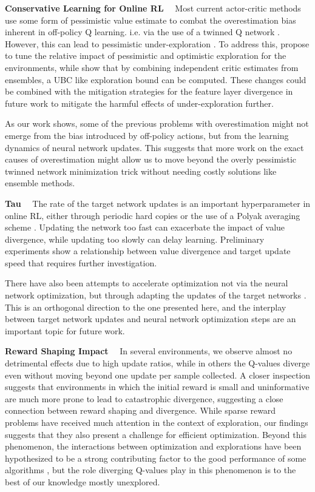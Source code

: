 {\bf Conservative Learning for Online RL}~~ Most current actor-critic methods use some form of pessimistic value estimate to combat the overestimation bias inherent in off-policy Q learning. i.e. via the use of a twinned Q network \parencite{fujimoto2018addressing}.
However, this can lead to pessimistic under-exploration \parencite{lan2020maxmin}.
To address this, \textcite{moskovitz2021tactical} propose to tune the relative impact of pessimistic and optimistic exploration for the environments, while \textcite{lee2021sunrise} show that by combining independent critic estimates from ensembles, a UBC like exploration bound can be computed.
These changes could be combined with the mitigation strategies for the feature layer divergence in future work to mitigate the harmful effects of under-exploration further.

As our work shows, some of the previous problems with overestimation might not emerge from the bias introduced by off-policy actions, but from the learning dynamics of neural network updates.
This suggests that more work on the exact causes of overestimation might allow us to move beyond the overly pessimistic twinned network minimization trick without needing costly solutions like ensemble methods.

{\bf Tau}~~ The rate of the target network updates is an important hyperparameter in online RL, either through periodic hard copies \parencite{mnih2013playing} or the use of a Polyak averaging scheme \parencite{lillicrap2016ddpg}.
Updating the network too fast can exacerbate the impact of value divergence, while updating too slowly can delay learning. Preliminary experiments show a relationship between value divergence and target update speed that requires further investigation.

There have also been attempts to accelerate optimization not via the neural network optimization, but through adapting the updates of the target networks \parencite{vieillard2020momentum,farahmand2021pid}.
This is an orthogonal direction to the one presented here, and the interplay between target network updates and neural network optimization steps are an important topic for future work.


{\bf Reward Shaping Impact}~~ In several environments, we observe almost no detrimental effects due to high update ratios, while in others the Q-values diverge even without moving beyond one update per sample collected.
A closer inspection suggests that environments in which the initial reward is small and uninformative are much more prone to lead to catastrophic divergence, suggesting a close connection between reward shaping and divergence.
While sparse reward problems have received much attention in the context of exploration, our findings suggests that they also present a challenge for efficient optimization.
Beyond this phenomenon, the interactions between optimization and explorations have been hypothesized to be a strong contributing factor to the good performance of some algorithms \parencite{schaul2022phenomenon}, but the role diverging Q-values play in this phenomenon is to the best of our knowledge mostly unexplored.



